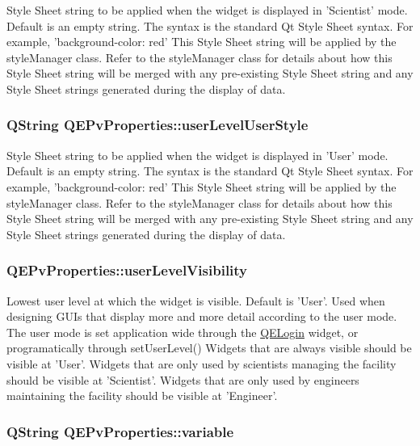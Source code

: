 Style Sheet string to be applied when the widget is displayed in 'Scientist' mode. Default is an empty string. The syntax is the standard Qt Style Sheet syntax. For example, 'background-\/color: red' This Style Sheet string will be applied by the styleManager class. Refer to the styleManager class for details about how this Style Sheet string will be merged with any pre-\/existing Style Sheet string and any Style Sheet strings generated during the display of data. \hypertarget{classQEPvProperties_ac9e82c5be2c61946398ebadc1be0f03e}{
\subsubsection[{userLevelUserStyle}]{\setlength{\rightskip}{0pt plus 5cm}QString QEPvProperties::userLevelUserStyle}}
\label{classQEPvProperties_ac9e82c5be2c61946398ebadc1be0f03e}
Style Sheet string to be applied when the widget is displayed in 'User' mode. Default is an empty string. The syntax is the standard Qt Style Sheet syntax. For example, 'background-\/color: red' This Style Sheet string will be applied by the styleManager class. Refer to the styleManager class for details about how this Style Sheet string will be merged with any pre-\/existing Style Sheet string and any Style Sheet strings generated during the display of data. \hypertarget{classQEPvProperties_ab298719b9ac151954f8ce9c9586f887f}{
\subsubsection[{userLevelVisibility}]{ QEPvProperties::userLevelVisibility}}
\label{classQEPvProperties_ab298719b9ac151954f8ce9c9586f887f}
Lowest user level at which the widget is visible. Default is 'User'. Used when designing GUIs that display more and more detail according to the user mode. The user mode is set application wide through the \hyperlink{classQELogin}{QELogin} widget, or programatically through setUserLevel() Widgets that are always visible should be visible at 'User'. Widgets that are only used by scientists managing the facility should be visible at 'Scientist'. Widgets that are only used by engineers maintaining the facility should be visible at 'Engineer'. \hypertarget{classQEPvProperties_a31bee423fb3b272fe17668fc0345e09d}{
\subsubsection[{variable}]{\setlength{\rightskip}{0pt plus 5cm}QString QEPvProperties::variable}}
